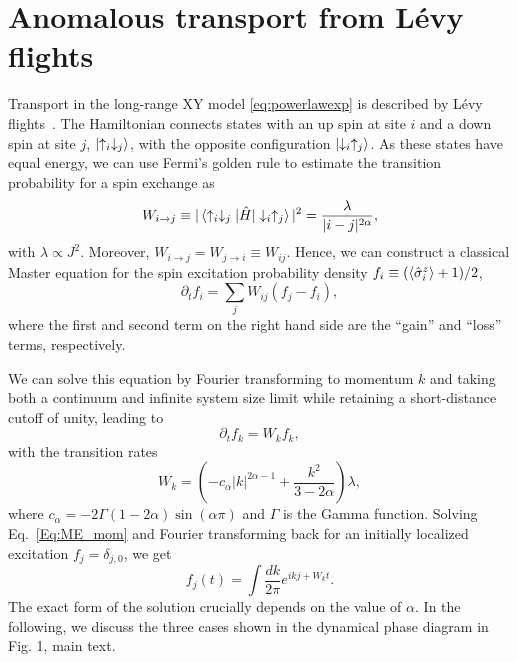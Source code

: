 \documentclass[aps,10pt,reprint,groupedaddress,superscriptaddress]{revtex4-2}
\begin{document}
\section{Anomalous transport from L\'evy flights}

Transport in the long-range XY model \eqref{eq:powerlawexp}
is described by L\'evy flights~\cite{PhysRevB.101.020416}. 
%
The Hamiltonian connects states with an up spin at site $i$ and a down spin at site $j$, $\ket{\uparrow_i \downarrow_j}$, with the opposite configuration $\ket{ \downarrow_i \uparrow_j}$. As these states have equal energy, we can use Fermi's golden rule to estimate the transition probability for a spin exchange as
\begin{equation}
    W_{i\rightarrow j} \equiv |\braket{\uparrow_i \downarrow_j|\hat H| \downarrow_i\uparrow_j }|^2 = \frac{\lambda}{|i-j|^{2\alpha}},
\end{equation}
with $\lambda\propto J^2$. Moreover, $W_{i\rightarrow j} =W_{j\rightarrow i} \equiv W_{ij}$. Hence, we can construct a classical Master equation for the spin excitation probability density $f_i\equiv (\braket{\hat \sigma^z_i}+1)/2$,
\begin{equation}
    \partial_t f_i = \sum_j W_{ij} (f_j-f_i),
\end{equation}
where the first and second term on the right hand side are the ``gain'' and ``loss'' terms, respectively. 

We can solve this equation by Fourier transforming to momentum $k$ and taking both a continuum and infinite system size limit while retaining a short-distance cutoff of unity, leading to 
\begin{equation}
    \partial_t f_k = W_k f_k,
    \label{Eq:ME_mom}
\end{equation}
with the transition rates
\begin{equation}
    W_k=\left( -c_\alpha |k|^{2\alpha-1} + \frac{k^2}{3-2\alpha}\right)\lambda,
    \label{Eq:FT_rates}
\end{equation}
where $c_\alpha= -2 \Gamma(1-2\alpha) \sin(\alpha \pi)$ and $\Gamma$ is the Gamma function. Solving Eq.~\eqref{Eq:ME_mom} and Fourier transforming back for an initially localized excitation $f_j=\delta_{j,0}$, we get
\begin{equation}
    f_j(t)=\int \frac{dk}{2\pi} e^{ikj+W_k t}.
    \label{Eq:solME}
\end{equation}
The exact form of the solution crucially depends on the value of $\alpha$. In the following, we discuss the three cases shown in the dynamical phase diagram in Fig. 1, main text.
\end{document}

